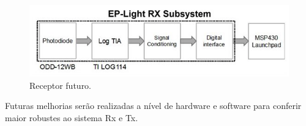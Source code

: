 \begin{figure}
	\centering
		\includegraphics[width=12cm]{figuras/sistema-futuro-recepcao}
	\caption{Receptor futuro.}
	\label{Fig: Receptor futuro}
\end{figure}


Futuras melhorias serão realizadas a nível de hardware e software para conferir maior robustes ao sistema Rx e Tx.

